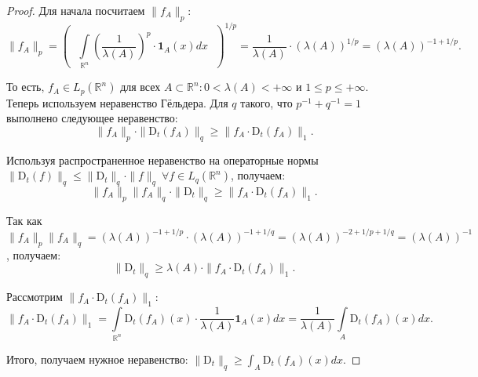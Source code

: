         \begin{proof}
            Для начала посчитаем $\|f_A\|_p$:
            \begin{equation*}
                \|f_A\|_p = \left( \text{ } \int\limits_{\mathbb{R}^n}\left(\dfrac{1}{\lambda(A)}\right)^p \cdot \textbf{1}_{A}(x) dx \text{ } \right)^{1/p} = \dfrac{1}{\lambda(A)} \cdot (\lambda(A))^{1/p} = (\lambda(A))^{-1 + 1/p}.
            \end{equation*}
            
            То есть, $f_A \in L_p(\mathbb{R}^n)$ для всех $A \subset \mathbb{R}^n : 0 < \lambda(A) < +\infty$ и $1 \leq p \leq +\infty$. 
            Теперь используем неравенство Гёльдера. Для $q$ такого, что $p^{-1} + q^{-1} = 1$ выполнено следующее неравенство:
            \begin{equation*}
                \|f_A\|_p \cdot \|\text{D}_t(f_A)\|_q \geq \|f_A \cdot \text{D}_t(f_A)\|_1.
            \end{equation*}
            
            Используя распространенное неравенство на операторные нормы $\|\text{D}_t(f)\|_q \leq \|\text{D}_t\|_q \cdot \|f\|_q ~\forall f \in L_q(\mathbb{R}^n)$, получаем:
            \begin{equation*}
                \|f_A\|_p \|f_A\|_q \cdot \|\text{D}_t\|_q \geq \|f_A \cdot \text{D}_t(f_A)\|_1.
            \end{equation*}
            
            Так как $\|f_A\|_p \|f_A\|_q = (\lambda(A))^{-1 + 1/p} \cdot (\lambda(A))^{-1 + 1/q} = (\lambda(A))^{-2 + 1/p + 1/q} = (\lambda(A))^{-1}$, получаем:
            \begin{equation*}
                \|\text{D}_t\|_q \geq \lambda(A) \cdot \|f_A \cdot \text{D}_t(f_A)\|_1.
            \end{equation*}
            
            Рассмотрим $\|f_A \cdot \text{D}_t(f_A)\|_1$:
            \begin{equation*}
                \|f_A \cdot \text{D}_t(f_A)\|_1 = \int\limits_{\mathbb{R}^n} \text{D}_t(f_A)(x) \cdot \dfrac{1}{\lambda(A)} \textbf{1}_{A}(x) dx = \dfrac{1}{\lambda(A)} \int\limits_{A} \text{D}_t(f_A)(x)dx.
            \end{equation*}
            
            Итого, получаем нужное неравенство:
            $
                \|\text{D}_t\|_q \geq \int_{A} \text{D}_t(f_A)(x)dx.
            $
        \end{proof}
    
